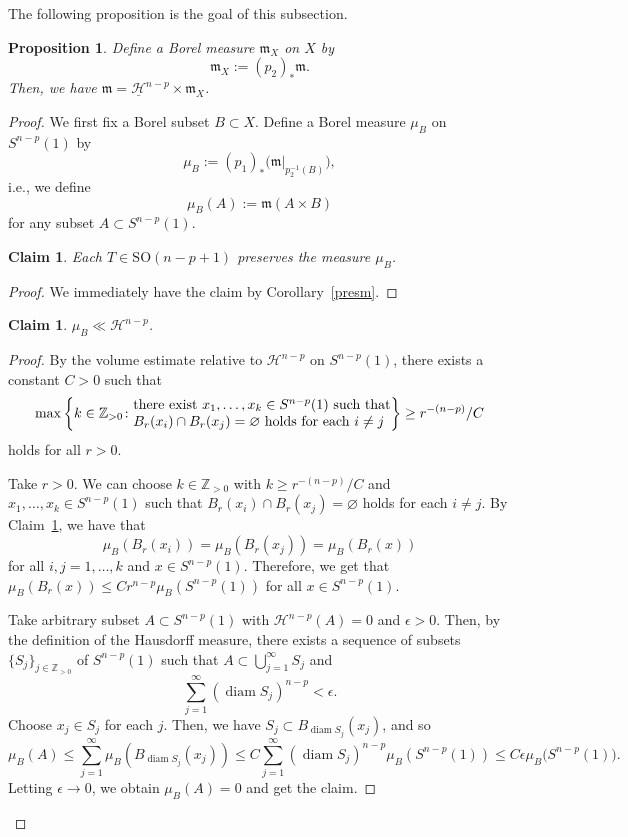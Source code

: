 \documentclass[10pt,a4paper]{amsart}
\numberwithin{equation}{section}
\newtheorem{Prop}[Thm]{Proposition}
\newtheorem{Clm}[Thm]{Claim}
\theoremstyle{definition}
\newcommand{\diam}{\operatorname{diam}}
\newcommand{\Z}{\mathbb{Z}}
\newcommand{\mf}{\mathfrak{m}}
\newcommand{\Ha}{\mathcal{H}}
\newcommand{\nHa}{\underline{\mathcal{H}}}
\begin{document}
The following proposition is the goal of this subsection.
\begin{Prop}\label{spms}
Define a Borel measure $\mf_X$ on $X$ by
\[
\mf_X:=(p_2)_\ast \mf.
\]
Then, we have $\mf=\nHa^{n-p}\times \mf_X$.
\end{Prop}
\begin{proof}
We first fix a Borel subset $B\subset X$. Define a Borel measure $\mu_B$ on $S^{n-p}(1)$ by
\[
\mu_B:=(p_1)_\ast \big(\mf|_{p_2^{-1}(B)}\big),
\]
i.e., we define
\[
\mu_B(A):=\mf(A\times B)
\]
for any subset $A\subset S^{n-p}(1)$.
\begin{Clm}\label{presmu}
Each $T\in \mathrm{SO}(n-p+1)$ preserves the measure $\mu_B$.
\end{Clm}
\begin{proof}
We immediately have the claim by Corollary~\ref{presm}.
\end{proof}
\begin{Clm}\label{ac}
$\mu_B\ll \Ha^{n-p}$.
\end{Clm}
\begin{proof}
By the volume estimate relative to $\Ha^{n-p}$ on $S^{n-p}(1)$, there exists a constant $C>0$ such that
\[
\max \left\{k\in\Z_{>0}\colon
\begin{array}{@{}l@{}}\text{there exist $x_1,\ldots,x_k\in S^{n-p}(1)$ such that}\\
\text{$B_r(x_i)\cap B_r(x_j)=\varnothing$ holds for each $i\neq j$}
\end{array}
\right\}\geq r^{-(n-p)}/C
\]
holds for all $r>0$.

Take $r>0$.
We can choose $k\in\Z_{>0}$ with $k\geq r^{-(n-p)}/C$ and $x_1,\ldots, x_k\in S^{n-p}(1)$ such that $B_r(x_i)\cap B_r(x_j)=\varnothing$ holds for each $i\neq j$.
By Claim~\ref{presmu}, we have that
\[
\mu_B(B_r(x_i))=\mu_B (B_r(x_j))=\mu_B(B_r(x))
\]
for all $i,j=1,\ldots,k$ and $x\in S^{n-p}(1)$.
Therefore, we get that $\mu_B(B_r(x))\leq Cr^{n-p}\mu_B(S^{n-p}(1))$ for all $x\in S^{n-p}(1)$.

Take arbitrary subset $A\subset S^{n-p}(1)$ with $\Ha^{n-p}(A)=0$ and $\epsilon>0$.
Then, by the definition of the Hausdorff measure, there exists a sequence of subsets $\{S_j\}_{j\in\Z_{>0}}$ of $S^{n-p}(1)$ such that
$A\subset \bigcup_{j=1}^\infty S_j$ and
\[
\sum_{j=1}^\infty (\diam S_j)^{n-p}<\epsilon.
\]
Choose $x_j\in S_j$ for each $j$.
Then, we have $S_j\subset B_{\diam S_j}(x_j)$, and so
\[
\mu_B(A)\leq \sum_{j=1}^\infty\mu_B(B_{\diam S_j}(x_j))
\leq C\sum_{j=1}^\infty (\diam S_j)^{n-p}\mu_B(S^{n-p}(1))\leq C\epsilon \mu_B\big(S^{n-p}(1)\big).
\]
Letting $\epsilon \to 0$, we obtain $\mu_B(A)=0$ and get the claim.
\end{proof}


\end{proof}
\end{document}
